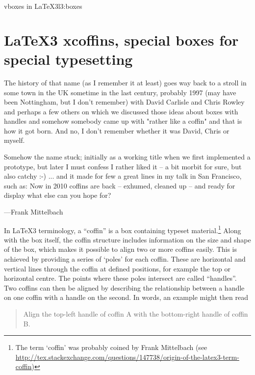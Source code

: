               
\begin{texexample}{vboxes in LaTeX3}{l3:boxes}
\ExplSyntaxOn
    \par
    \par
\ExplSyntaxOff
\vspace*{1cm}
\end{texexample}

\chapter{LaTeX3 xcoffins, special boxes for special typesetting}

\epigraph{The history of that name (as I remember it at least) goes way back to a stroll in some town in the UK sometime in the last century, probably 1997 (may have been Nottingham, but I don't remember) with David Carlisle and Chris Rowley and perhaps a few others on which we discussed those ideas about boxes with handles and somehow somebody came up with "rather like a coffin" and that is how it got born. And no, I don't remember whether it was David, Chris or myself.

Somehow the name stuck; initially as a working title when we first implemented a prototype, but later I must confess I rather liked it -- a bit morbit for sure, but also catchy :-) ... and it made for few a great lines in my talk in San Francisco, such as: Now in 2010 coffins are back – exhumed, cleaned up – and ready for display
what else can you hope for?}{---Frank Mittelbach}


          
 In \LaTeX3 terminology, a \enquote{coffin} is a box containing
 typeset material.\footnote{The term `coffin’ was probably coined by Frank Mittelbach (see \protect\url{http://tex.stackexchange.com/questions/147738/origin-of-the-latex3-term-coffin})} Along with the box itself, the coffin structure
 includes information on the size and shape of the box, which makes
 it possible to align two or more coffins easily. This is achieved
 by providing a series of `poles' for each coffin. These
 are horizontal and vertical lines through the coffin at defined
 positions, for example the top or horizontal centre. The points
 where these poles intersect are called \enquote{handles}. Two
 coffins can then be aligned by describing the relationship between
 a handle on one coffin with a handle on the second. In words, an
 example might then read
 \begin{quote}
   Align the top-left handle of coffin A with the bottom-right
   handle of coffin B.
 \end{quote}


